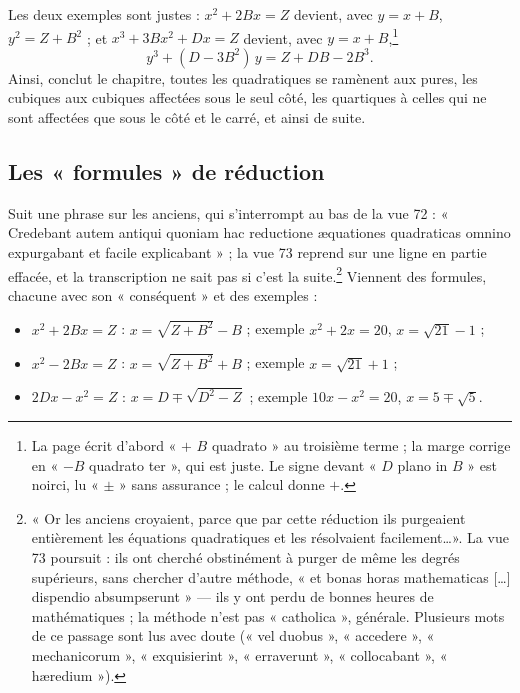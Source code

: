 \documentclass[11pt,a4paper]{article}
\begin{document}
Les deux exemples sont justes : $x^2 + 2Bx = Z$ devient, avec $y = x + B$,
$y^2 = Z + B^2$ ; et $x^3 + 3Bx^2 + Dx = Z$ devient, avec
$y = x + B$,\footnote{La page écrit d'abord « $+$ $B$ quadrato » au troisième terme ;
la marge corrige en « $- B$ quadrato ter », qui est juste. Le signe devant « $D$
plano in $B$ » est noirci, lu « $\pm$ » sans assurance ; le calcul donne $+$.}
\[ y^3 + (D - 3B^2)\,y = Z + DB - 2B^3 . \]
Ainsi,
conclut le chapitre, toutes les quadratiques se ramènent aux pures, les cubiques
aux cubiques affectées sous le seul côté, les quartiques à celles qui ne sont
affectées que sous le côté et le carré, et ainsi de suite.

\subsection*{Les « formules » de réduction}

Suit une phrase sur les anciens, qui s'interrompt au bas de la vue 72 :
« Credebant autem antiqui quoniam hac reductione æquationes quadraticas omnino
expurgabant et facile explicabant » ; la vue 73 reprend sur une ligne en partie
effacée, et la transcription ne sait pas si c'est la suite.\footnote{« Or les
anciens croyaient, parce que par cette réduction ils purgeaient entièrement les
équations quadratiques et les résolvaient facilement\ldots ». La vue 73 poursuit :
ils ont cherché obstinément à purger de même les degrés supérieurs, sans
chercher d'autre méthode, « et bonas horas mathematicas [\ldots] dispendio
absumpserunt » — ils y ont perdu de bonnes heures de mathématiques ; la méthode
n'est pas « catholica », générale. Plusieurs mots de ce passage sont lus avec
doute (« vel duobus », « accedere », « mechanicorum », « exquisierint »,
« erraverunt », « collocabant », « hæredium »).} Viennent des formules, chacune
avec son « conséquent » et des exemples :

\begin{itemize}
  \item $x^2 + 2Bx = Z$ : $x = \sqrt{Z + B^2} - B$ ; exemple $x^2 + 2x = 20$,
    $x = \sqrt{21} - 1$ ;
  \item $x^2 - 2Bx = Z$ : $x = \sqrt{Z + B^2} + B$ ; exemple
    $x = \sqrt{21} + 1$ ;
  \item $2Dx - x^2 = Z$ : $x = D \mp \sqrt{D^2 - Z}$ ; exemple $10x - x^2 = 20$,
    $x = 5 \mp \sqrt{5}$.
\end{itemize}
\end{document}
